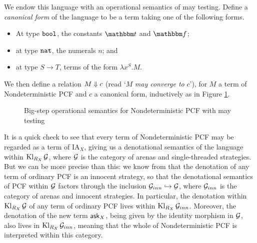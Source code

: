 \documentclass[11pt]{report}
\begin{document}
We endow this language with an operational semantics of may testing.  
Define a \emph{canonical form} of the language to be a term taking one of the following forms.
\begin{itemize}
  \item At type ${\mathtt{bool}}$, the constants $\true$ and $\false$;
  \item at type ${\mathtt{nat}}$, the numerals $n$; and
  \item at type $S \to T$, terms of the form $\lambda x^S.M$.
\end{itemize}
We then define a relation $M \Downarrow c$ (read `$M$ \emph{may converge to} $c$'), for $M$ a term of Nondeterministic PCF and $c$ a canonical form, inductively as in Figure \ref{FigNDPCFOpSem}.
\begin{figure}
  \caption{Big-step operational semantics for Nondeterministic PCF with may testing}
  \label{FigNDPCFOpSem}
\end{figure}

It is a quick check to see that every term of Nondeterministic PCF may be regarded as a term of IA${}_X$, giving us a denotational semantics of the language within $\operatorname{Kl}_{R_X}\mathcal G$, where $\mathcal G$ is the category of arenas and single-threaded strategies.
But we can be more precise than this: we know from \cite{hoPcf} that the denotation of any term of ordinary PCF is an innocent strategy, so that the denotational semantics of PCF within $\mathcal G$ factors through the inclusion $\mathcal G_{inn}\hookrightarrow\mathcal G$, where $\mathcal G_{inn}$ is the category of arenas and innocent strategies.
In particular, the denotation within $\operatorname{Kl}_{R_X}\mathcal G$ of any term of ordinary PCF lives within $\operatorname{Kl}_{R_X}\mathcal G_{inn}$.
Moreover, the denotation of the new term $\operatorname{{\mathsf{ask}}}_X$, being given by the identity morphism in $\mathcal G$, also lives in $\operatorname{Kl}_{R_X}\mathcal G_{inn}$, meaning that the whole of Nondeterministic PCF is interpreted within this category.
\end{document}
